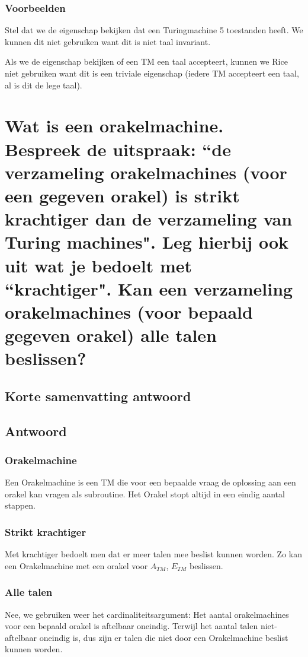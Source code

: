 \documentclass{article}
\begin{document}
        \subsubsection{Voorbeelden}
            Stel dat we de eigenschap bekijken dat een Turingmachine 5 toestanden heeft. We kunnen dit niet gebruiken want dit is niet taal invariant.

            Als we de eigenschap bekijken of een TM een taal accepteert, kunnen we Rice niet gebruiken want dit is een triviale eigenschap (iedere TM accepteert een taal, al is dit de lege taal).


\newpage
\section{Wat is een orakelmachine. Bespreek de uitspraak: ``de verzameling orakelmachines (voor een gegeven orakel) is strikt krachtiger dan de verzameling van Turing machines". Leg hierbij ook uit wat je bedoelt met ``krachtiger". Kan een verzameling orakelmachines (voor bepaald gegeven orakel) alle talen beslissen?}
    \subsection{Korte samenvatting antwoord}

    \subsection{Antwoord}
        \subsubsection{Orakelmachine}
            Een Orakelmachine is een TM die voor een bepaalde vraag de oplossing aan een orakel kan vragen als subroutine. Het Orakel stopt altijd in een eindig aantal stappen.

        \subsubsection{Strikt krachtiger}
            Met krachtiger bedoelt men dat er meer talen mee beslist kunnen worden. Zo kan een Orakelmachine met een orakel voor $A_{TM}$, $E_{TM}$ beslissen.

        \subsubsection{Alle talen}
            Nee, we gebruiken weer het cardinaliteitsargument:
            Het aantal orakelmachines voor een bepaald orakel is aftelbaar oneindig. Terwijl het aantal talen niet-aftelbaar oneindig is, dus zijn er talen die niet door een Orakelmachine beslist kunnen worden.
\end{document}

